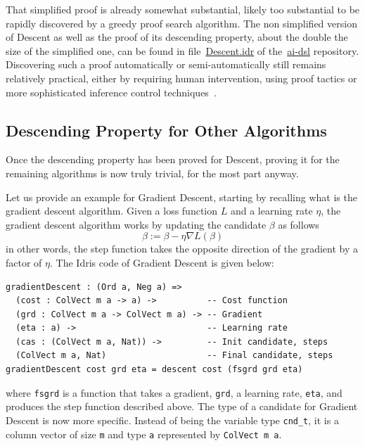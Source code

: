 \documentclass[]{report}
\begin{document}
That simplified proof is already somewhat substantial, likely too
substantial to be rapidly discovered by a greedy proof search
algorithm.  The non simplified version of Descent as well as the proof
of its descending property, about the double the size of the
simplified one, can be found in
file~\href{https://github.com/singnet/ai-dsl/blob/master/experimental/ai-algorithms/descent/Search/Descent.idr}{Descent.idr}
of the~\href{https://github.com/singnet/ai-dsl}{ai-dsl} repository.
Discovering such a proof automatically or semi-automatically still
remains relatively practical, either by requiring human intervention,
using proof tactics or more sophisticated inference control
techniques~\cite{Goertzel2014EGI2Chapt18}.

\subsection{Descending Property for Other Algorithms}
Once the descending property has been proved for Descent, proving it
for the remaining algorithms is now truly trivial, for the most part
anyway.

Let us provide an example for Gradient Descent, starting by recalling
what is the gradient descent algorithm.  Given a loss function $L$ and
a learning rate $\eta$, the gradient descent algorithm works by
updating the candidate $\beta$ as follows
$$\beta := \beta - \eta \nabla L(\beta)$$
in other words, the step function takes the opposite direction of the
gradient by a factor of $\eta$.  The Idris code of Gradient Descent is
given below:
\begin{verbatim}
gradientDescent : (Ord a, Neg a) =>
  (cost : ColVect m a -> a) ->          -- Cost function
  (grd : ColVect m a -> ColVect m a) -> -- Gradient
  (eta : a) ->                          -- Learning rate
  (cas : (ColVect m a, Nat)) ->         -- Init candidate, steps
  (ColVect m a, Nat)                    -- Final candidate, steps
gradientDescent cost grd eta = descent cost (fsgrd grd eta)
\end{verbatim}
where \texttt{fsgrd} is a function that takes a gradient,
\texttt{grd}, a learning rate, \texttt{eta}, and produces the step
function described above.  The type of a candidate for Gradient
Descent is now more specific.  Instead of being the variable type
\texttt{cnd\_t}, it is a column vector of size \texttt{m} and type
\texttt{a} represented by \texttt{ColVect m a}.
\end{document}
